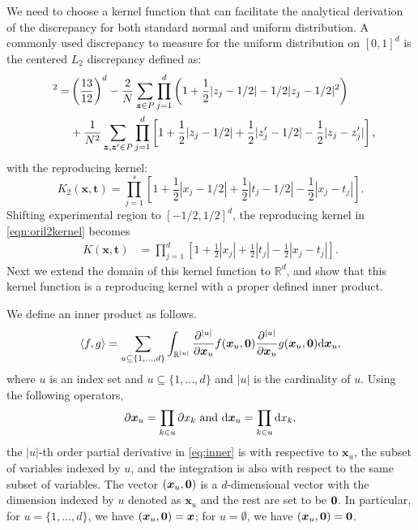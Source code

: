 \documentclass[graybox]{svmult}
\newcommand{\vx}{\boldsymbol{x}}
\newcommand{\vt}{\boldsymbol{t}}
\newcommand{\vz}{\boldsymbol{z}}
\newcommand{\dif}{{\rm d}}
\begin{document}
We need to choose a kernel function that can facilitate the analytical derivation of the discrepancy for both standard normal and uniform distribution. 
A commonly used discrepancy to measure for the uniform distribution on $[0,1]^d$ is the centered $L_2$ discrepancy \cite{Hic97a} defined as:
\begin{align*}
[D_2(P)]^2 =& \left(\frac{13}{12}\right)^d - \frac{2}{N}\sum\limits_{\vz\in P}\prod_{j=1}^d \left(1+\frac{1}{2}|z_j-1/2|-1/2|z_j-1/2|^2\right)\\
\hspace{5ex}&+ \frac{1}{N^2}\sum\limits_{\vz,\vz'\in P}\prod_{j=1}^d\left[1+\frac{1}{2}|z_j-1/2|+\frac{1}{2}|z_j'-1/2|-\frac{1}{2}|z_j-z_j'|\right],    
\end{align*}
with the reproducing kernel:
\begin{equation}\label{eqn:oril2kernel}
K_2(\vx,\vt) = \prod\limits_{j=1}^s\left[1+\frac{1}{2}|x_j-1/2|+\frac{1}{2}|t_j-1/2|-\frac{1}{2}|x_j-t_j|\right].
\end{equation}
Shifting experimental region to $[-1/2,1/2]^d$, the reproducing kernel in \eqref{eqn:oril2kernel} becomes
\begin{align}\label{eqn:l2kernel}
K(\vx,\vt) & = \prod\limits_{j=1}^d\left[1+\frac{1}{2}|x_j|+\frac{1}{2}|t_j|-\frac{1}{2}|x_j-t_j|\right].  
\end{align}
Next we extend the domain of this kernel function to $\mathbb{R}^d$, and show that this kernel function is a reproducing kernel with a proper defined inner product. 

We define an inner product as follows. 
\begin{equation}\label{eq:inner}
\langle f,g \rangle = \sum_{u\subseteq \{1,...,d\}}\int_{\mathbb{R}^{|u|}}\frac{\partial^{|u|}}{\partial \vx_u}f(\vx_u,{\bf 0})\frac{\partial^{|u|}}{\partial \vx_u}g(\vx_u,{\bf 0})\dif \vx_u,
\end{equation}
where $u$ is an index set and $u\subseteq \{1, \ldots, d\}$ and $|u|$ is the cardinality of $u$. 
Using the following operators, 
$$\partial \vx_u = \prod\limits_{k\in u}\partial x_k \text{ and } \dif \vx_u = \prod\limits_{k\in u}\dif x_k , $$
the $|u|$-th order partial derivative in \eqref{eq:inner} is with respective to $\vx_{u}$, the subset of variables indexed by $u$, and the integration is also with respect to the same subset of variables. 
The vector $(\vx_u,{\bf 0})$ is a $d$-dimensional vector with the dimension indexed by $u$ denoted as $\vx_u$ and the rest are set to be ${\bf 0}$. 
In particular, for $u = \{1,...,d\}$, we have $(\vx_u,{\bf 0}) = \vx$; for $u=\emptyset$, we have $(\vx_u,{\bf 0}) = {\bf 0}$.
\end{document}
